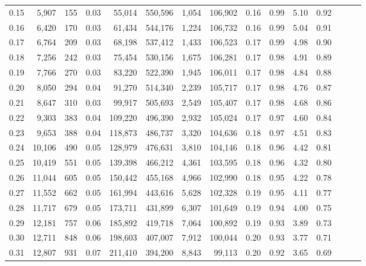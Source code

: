 \begin{tabular}{rrrrrrrrrrrrrrr}
0.15 &   5,907 &    155 &  0.03 &   55,014 &  550,596 &    1,054 &  106,902 &  0.16 &  0.99 &  5.10 &      0.92 \\
0.16 &   6,420 &    170 &  0.03 &   61,434 &  544,176 &    1,224 &  106,732 &  0.16 &  0.99 &  5.04 &      0.91 \\
0.17 &   6,764 &    209 &  0.03 &   68,198 &  537,412 &    1,433 &  106,523 &  0.17 &  0.99 &  4.98 &      0.90 \\
0.18 &   7,256 &    242 &  0.03 &   75,454 &  530,156 &    1,675 &  106,281 &  0.17 &  0.98 &  4.91 &      0.89 \\
0.19 &   7,766 &    270 &  0.03 &   83,220 &  522,390 &    1,945 &  106,011 &  0.17 &  0.98 &  4.84 &      0.88 \\
0.20 &   8,050 &    294 &  0.04 &   91,270 &  514,340 &    2,239 &  105,717 &  0.17 &  0.98 &  4.76 &      0.87 \\
0.21 &   8,647 &    310 &  0.03 &   99,917 &  505,693 &    2,549 &  105,407 &  0.17 &  0.98 &  4.68 &      0.86 \\
0.22 &   9,303 &    383 &  0.04 &  109,220 &  496,390 &    2,932 &  105,024 &  0.17 &  0.97 &  4.60 &      0.84 \\
0.23 &   9,653 &    388 &  0.04 &  118,873 &  486,737 &    3,320 &  104,636 &  0.18 &  0.97 &  4.51 &      0.83 \\
0.24 &  10,106 &    490 &  0.05 &  128,979 &  476,631 &    3,810 &  104,146 &  0.18 &  0.96 &  4.42 &      0.81 \\
0.25 &  10,419 &    551 &  0.05 &  139,398 &  466,212 &    4,361 &  103,595 &  0.18 &  0.96 &  4.32 &      0.80 \\
0.26 &  11,044 &    605 &  0.05 &  150,442 &  455,168 &    4,966 &  102,990 &  0.18 &  0.95 &  4.22 &      0.78 \\
0.27 &  11,552 &    662 &  0.05 &  161,994 &  443,616 &    5,628 &  102,328 &  0.19 &  0.95 &  4.11 &      0.77 \\
0.28 &  11,717 &    679 &  0.05 &  173,711 &  431,899 &    6,307 &  101,649 &  0.19 &  0.94 &  4.00 &      0.75 \\
0.29 &  12,181 &    757 &  0.06 &  185,892 &  419,718 &    7,064 &  100,892 &  0.19 &  0.93 &  3.89 &      0.73 \\
0.30 &  12,711 &    848 &  0.06 &  198,603 &  407,007 &    7,912 &  100,044 &  0.20 &  0.93 &  3.77 &      0.71 \\
0.31 &  12,807 &    931 &  0.07 &  211,410 &  394,200 &    8,843 &   99,113 &  0.20 &  0.92 &  3.65 &      0.69 \\

\end{tabular}
